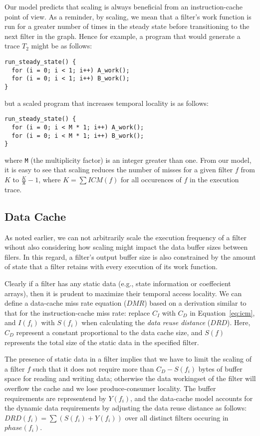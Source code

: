 Our model predicts that scaling is always beneficial from an
instruction-cache point of view. As a reminder, by scaling, we mean
that a filter's work function is run for a greater number of times in
the steady state before transitioning to the next filter in the
graph. Hence for example, a program that would generate a trace $T_2$
might be as follows:
\begin{verbatim}
run_steady_state() {
  for (i = 0; i < 1; i++) A_work();
  for (i = 0; i < 1; i++) B_work();
}
\end{verbatim}
but a scaled program that increases temporal locality is as follows:
\begin{verbatim}
run_steady_state() {
  for (i = 0; i < M * 1; i++) A_work();
  for (i = 0; i < M * 1; i++) B_work();
}
\end{verbatim}
where \texttt{M} (the multiplicity factor) is an integer greater than
one. From our model, it is easy to see that scaling reduces the number
of misses for a given filter $f$ from $K$ to $\frac{K}{\texttt{M}}- 1$, where $K =
\sum ICM(f)$ for all occurences of $f$ in  the execution trace.

\subsection{Data Cache}

As noted earlier, we can not arbitrarily scale the execution frequency
of a filter wihout also considering how scaling might impact
the data buffer sizes between filers. In this regard, a filter's
output buffer size is also constrained by the amount of state that a
filter retains with every execution of its work function.

Clearly if a filter has any static data (e.g., state information or
coeffecient arrays), then it is prudent to maximize their temporal
access locality. We can define a data-cache miss rate equation ($DMR$) based on
a derivation similar to that for the instruction-cache miss rate:
replace $C_I$ with $C_D$ in Equation~\ref{eq:icm}, and $I(f_i)$ with
$S(f_i)$ when calculating the {\it data reuse distance} ($DRD$). 
Here, $C_D$ represent a constant proportional to the data cache size,
and $S(f)$ represents the total size of the static data in the
specified filter.

The presence of static data in a filter implies that we have to limit
the scaling of a filter $f$ such that it does not require more than $C_D -
S(f_i)$ bytes of buffer space for reading and writing data; otherwise
the data workingset of the filter will overflow the cache and we lose
produce-consumer locality. The buffer requirements are representend by
$Y(f_i)$, and the data-cache model accounts for the dynamic data
requirements by adjusting the data reuse distance as follows:
$DRD(f_i) = \sum (S(f_i) + Y(f_i))$ over all distinct filters occuring
in $phase(f_i)$.

